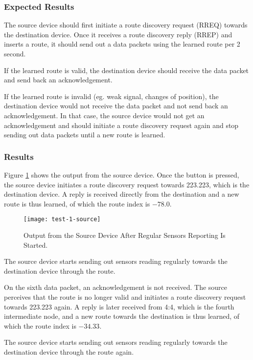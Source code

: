 \subsubsection{Expected Results}
The source device should first initiate a route discovery request (RREQ) towards the destination device.
Once it receives a route discovery reply (RREP) and inserts a route, it should send out a data packets using the learned route per 2 second.

If the learned route is valid, the destination device should receive the data packet and send back an acknowledgement.

If the learned route is invalid (eg. weak signal, changes of position), the destination device would not receive the data packet and not send back an acknowledgement.
In that case, the source device would not get an acknowledgement and should initiate a route discovery request again and stop sending out data packets until a new route is learned.

\subsubsection{Results}
Figure \ref{fig:test-1-source} shows the output from the source device.
Once the button is pressed, the source device initiates a route discovery request towards 223.223, which is the destination device.
A reply is received directly from the destination and a new route is thus learned, of which the route index is $-78.0$.

\begin{figure}
\centering
\texttt{[image: test-1-source]}
\caption{Output from the Source Device After Regular Sensors Reporting Is Started.}
\label{fig:test-1-source}
\end{figure}

The source device starts sending out sensors reading regularly towards the destination device through the route.

On the sixth data packet, an acknowledgement is not received. The source perceives that the route is no longer valid and initiates a route discovery request towards 223.223 again.
A reply is later received from 4:4, which is the fourth intermediate node, and a new route towards the destination is thus learned, of which the route index is $-34.33$.

The source device starts sending out sensors reading regularly towards the destination device through the route again.

